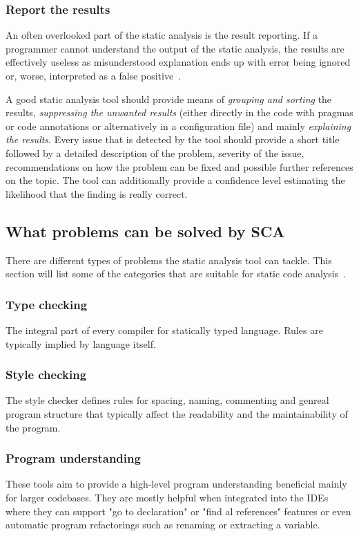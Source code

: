 \documentclass[
  digital, %
  table,   %
  lof,     %
  lot,     %
  oneside,
]{fithesis3}
\begin{document}
\subsubsection{Report the results}
An often overlooked part of the static analysis is the result reporting. If a programmer cannot understand the output of the static analysis, the results are effectively useless as misunderstood explanation ends up with error being ignored or, worse, interpreted as a false positive~\cite{coverity-sca}.

A good static analysis tool should provide means of \textit{grouping and sorting} the results, \textit{suppressing the unwanted results} (either directly in the code with pragmas or code annotations or alternatively in a configuration file) and mainly \textit{explaining the results}. Every issue that is detected by the tool should provide a short title followed by a detailed description of the problem, severity of the issue, recommendations on how the problem can be fixed and possible further references on the topic. The tool can additionally provide a confidence level estimating the likelihood that the finding is really correct.

\subsection{What problems can be solved by SCA}
There are different types of problems the static analysis tool can tackle. This section will list some of the categories that are suitable for static code analysis~\cite{secure-programming-sca}.

\subsubsection{Type checking}
The integral part of every compiler for statically typed language. Rules are typically implied by language itself.

\subsubsection{Style checking}
The style checker defines rules for spacing, naming, commenting and genreal program structure that typically affect the readability and the maintainability of the program. 

\subsubsection{Program understanding}
These tools aim to provide a high-level program understanding beneficial mainly for larger codebases. They are mostly helpful when integrated into the IDEs where they can support "go to declaration" or "find al references" features or even automatic program refactorings such as renaming or extracting a variable.
\end{document}
